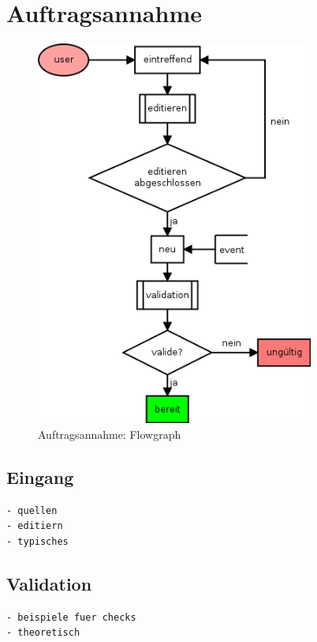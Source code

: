 \section{Auftragsannahme}


\begin{figure}[ht] 
  \label{fig:lebenszyklus-auftrag-eingang}
  \begin{center}
      \includegraphics[height=5in]{imageinput/lebenszyklus-auftrag-eingang.png}
  \end{center}
  \caption{Auftragsannahme: Flowgraph}
\end{figure}


\subsection{Eingang}

\begin{verbatim}
- quellen
- editiern
- typisches
\end{verbatim}

\subsection{Validation}
\begin{verbatim}
- beispiele fuer checks
- theoretisch
\end{verbatim}



